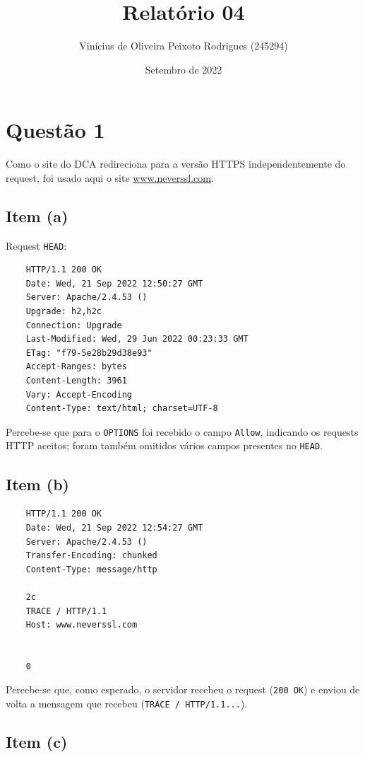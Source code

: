 \documentclass{article}
\title{Relatório 04}
\author{Vinícius de Oliveira Peixoto Rodrigues (245294)}
\date{Setembro de 2022}
\begin{document}
\maketitle

\section*{Questão 1}

Como o site do DCA redireciona para a versão HTTPS independentemente do request, foi usado aqui o site \url{www.neverssl.com}.

\subsection*{Item (a)}

Request \texttt{HEAD}:

\begin{verbatim}
    HTTP/1.1 200 OK
    Date: Wed, 21 Sep 2022 12:50:27 GMT
    Server: Apache/2.4.53 ()
    Upgrade: h2,h2c
    Connection: Upgrade
    Last-Modified: Wed, 29 Jun 2022 00:23:33 GMT
    ETag: "f79-5e28b29d38e93"
    Accept-Ranges: bytes
    Content-Length: 3961
    Vary: Accept-Encoding
    Content-Type: text/html; charset=UTF-8
\end{verbatim}

Percebe-se que para o \texttt{OPTIONS} foi recebido o campo \texttt{Allow}, indicando os requests HTTP aceitos; foram também omitidos vários campos presentes no \texttt{HEAD}.

\subsection*{Item (b)}

\begin{verbatim}
    HTTP/1.1 200 OK
    Date: Wed, 21 Sep 2022 12:54:27 GMT
    Server: Apache/2.4.53 ()
    Transfer-Encoding: chunked
    Content-Type: message/http

    2c
    TRACE / HTTP/1.1
    Host: www.neverssl.com


    0

\end{verbatim}

Percebe-se que, como esperado, o servidor recebeu o request (\texttt{200 OK}) e enviou de volta a mensagem que recebeu (\texttt{TRACE / HTTP/1.1...}).

\subsection*{Item (c)}
\end{document}
